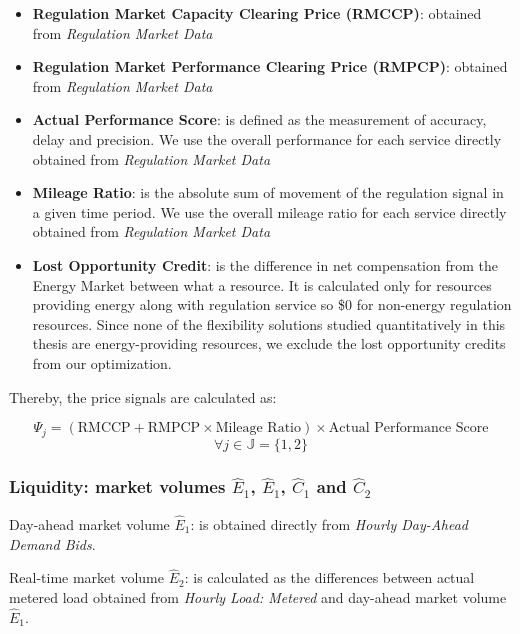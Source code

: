 \begin{itemize}
	\item \textbf{Regulation Market Capacity Clearing Price (RMCCP)}: obtained from \textit{ Regulation Market Data}
	\item \textbf{Regulation Market Performance Clearing Price (RMPCP)}: obtained from \textit{ Regulation Market Data}
	\item \textbf{Actual Performance Score}: is defined as the measurement of accuracy, delay and precision. We use the overall performance for each service directly obtained from \textit{ Regulation Market Data}
	\item \textbf{Mileage Ratio}: is the absolute sum of movement of the regulation signal in a given time period. We use the overall mileage ratio for each service directly obtained from \textit{ Regulation Market Data}
	\item \textbf{Lost Opportunity Credit}: is the difference in net compensation from the Energy Market between what a resource. It is calculated only for resources providing energy along with regulation service so \$0 for non-energy regulation resources. Since none of the flexibility solutions studied quantitatively in this thesis are energy-providing resources, we exclude the lost opportunity credits from our optimization.
\end{itemize}

Thereby, the price signals are calculated as:

\begin{equation*}
\Psi_j = \left(\text{RMCCP} + \text{RMPCP} \times \text{Mileage Ratio}\right) \times \text{Actual Performance Score}
\end{equation*}
\begin{equation*}
\forall j \in \mathbb{J} =\{1,2\}
\end{equation*}

\subsubsection{Liquidity: market volumes $\hat{E}_1$, $\hat{E}_1$, $\hat{C}_1$ and $\hat{C}_2$}
Day-ahead market volume $\hat{E}_1$: is obtained directly from \textit{Hourly Day-Ahead Demand Bids}.

Real-time market volume $\hat{E}_2$: is calculated as the differences between actual metered load obtained from \textit{Hourly Load: Metered} and day-ahead market volume $\hat{E}_1$.

